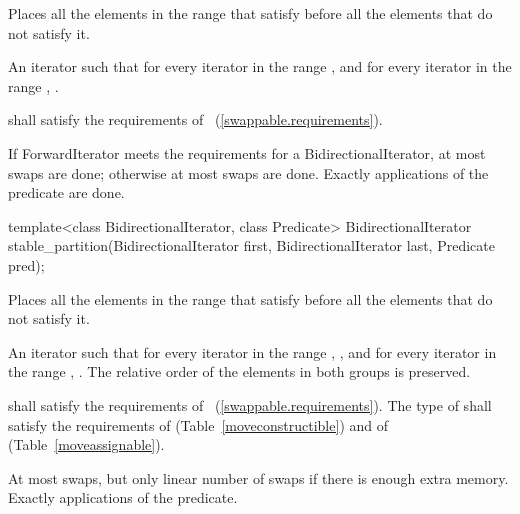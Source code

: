 \begin{itemdescr}
\pnum
\effects Places all the elements in the range  that satisfy  before all the elements that do not satisfy it.

\pnum
\returns An iterator  such that for every iterator  in the range
 , and for every iterator  in the
range , .

\pnum
\requires
{} shall satisfy the requirements of
~(\ref{swappable.requirements}).

\pnum
\complexity If ForwardIterator meets the requirements for a BidirectionalIterator, at most
 swaps are done; otherwise at most  swaps
are done. Exactly  applications of the predicate are done.
\end{itemdescr}

%
\begin{itemdecl}
template<class BidirectionalIterator, class Predicate>
  BidirectionalIterator
    stable_partition(BidirectionalIterator first,
                     BidirectionalIterator last, Predicate pred);
\end{itemdecl}

\begin{itemdescr}
\pnum
\effects
Places all the elements in the range
that satisfy  before all the
elements that do not satisfy it.

\pnum
\returns
An iterator
such that for every iterator
in the range
,
,
and for every iterator
in the range
,
.
The relative order of the elements in both groups is preserved.

\pnum
\requires
{} shall satisfy the requirements of
~(\ref{swappable.requirements}). The type
of  shall satisfy the requirements of
 (Table~\ref{moveconstructible}) and of
 (Table~\ref{moveassignable}).

\pnum
\complexity
At most
swaps, but only linear number of swaps if there is enough extra memory.
Exactly
applications of the predicate.
\end{itemdescr}

